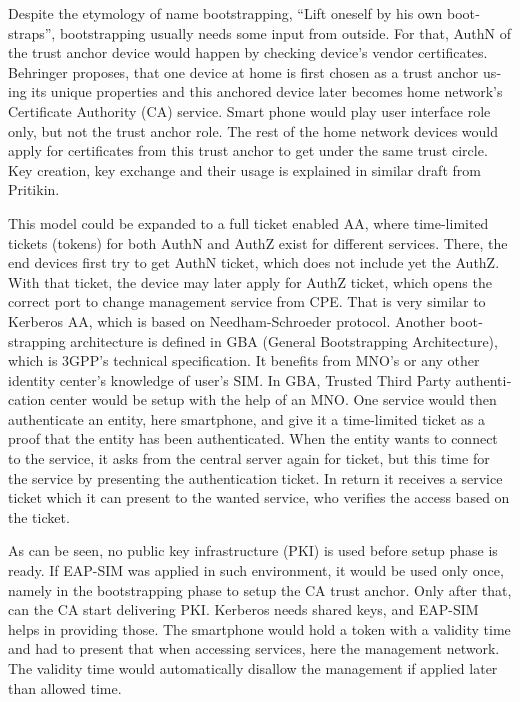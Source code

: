 \documentclass[12pt,a4paper,english]{tutthesis}
\begin{document}
\begin{otherlanguage}{english}
Despite the etymology of name bootstrapping, ``Lift oneself by his own
bootstraps'', bootstrapping usually needs some input from outside.
For that, AuthN of the trust anchor device would happen by checking
device's vendor certificates. 
Behringer\cite{draft-behringer-bootstrap} proposes, that one device
at home is first chosen as a trust anchor  using its unique properties 
and this anchored device later becomes home
network's Certificate Authority (CA) service. Smart phone would play
user interface role only, but not the trust anchor role.
The rest of the home network devices would apply for
certificates from this trust anchor to get under the same trust circle.  Key creation,
key exchange and their usage is explained in similar draft from
Pritikin\cite{draft-pritikin-bootstrap}. 


This model could be expanded to a full ticket enabled 
AA, where time-limited tickets (tokens) for both
AuthN and AuthZ exist for different services.
There, the end devices  first try to get AuthN ticket, which 
does not include yet the AuthZ.
With that ticket, the device may later apply for AuthZ ticket, which
opens the correct port to change management service from CPE.
That is very similar to Kerberos AA, which is based on
Needham-Schroeder protocol.
Another bootstrapping architecture is 
defined in GBA (General Bootstrapping Architecture)\cite{gba2014}, which 
is 3GPP's technical specification. 
It benefits from MNO's or any other identity center's  knowledge of user's SIM.
In GBA, Trusted Third Party authentication center would be setup with
the help of an MNO.
One service would then authenticate an entity, here smartphone, and
give it a time-limited ticket as a proof that the entity has been authenticated.
When the entity wants to connect to the service, it asks from the central 
server again for ticket, but this time for the service by presenting
the authentication ticket. In return it receives a service ticket which
it can present to the wanted service, who verifies the access based
on the ticket. 



As can be seen, no public key infrastructure (PKI) is used before
setup phase is ready.  If EAP-SIM was applied in such environment, it
would be used only once, namely in the bootstrapping phase to setup
the CA trust anchor.  Only after that, can the CA start delivering
PKI. Kerberos needs shared keys, and EAP-SIM helps in providing those.
The smartphone would hold a token with a validity time and had to
present that when accessing services, here the management network. The
validity time would automatically disallow the management if applied
later than allowed time.


\end{otherlanguage}
\end{document}
